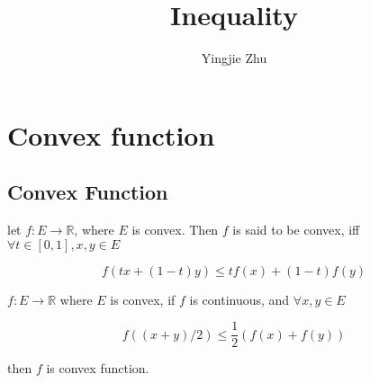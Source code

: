 \documentclass[11pt,a4paper]{article}
\title{Inequality}
\author{Yingjie Zhu}
\begin{document}
\maketitle

\tableofcontents

\section{Convex function}

\subsection{Convex Function}

\begin{definition}
    let $f: E \to \mathbb{R}$, where $E$ is convex. Then $f$ is said to be convex, iff $\forall t \in [0,1], x,y \in E$

    \[
        f(tx + (1-t)y) \le t f(x) + (1-t)f(y)
    \]
\end{definition}

\begin{thm}
    $f: E \to \mathbb{R}$ where $E$ is convex, if $f$ is continuous, and $\forall x,y \in E$

    \[
        f( (x+y)/2) \le \frac{1}{2} \left( f(x) + f(y) \right)
    \]

    then $f$ is convex function.
\end{thm}
\end{document}
